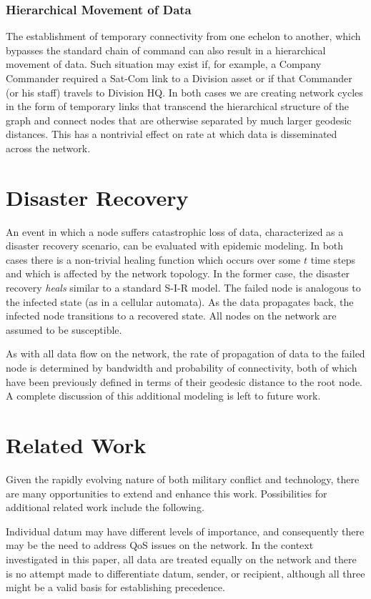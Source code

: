 \documentclass[10pt]{./IEEEtran}
\begin{document}
\subsubsection{Hierarchical Movement of Data}
The establishment of temporary connectivity from one echelon to another, which bypasses the standard chain of command can also result in a hierarchical movement of data.  Such situation may exist if, for example, a Company Commander required a Sat-Com link to a Division asset or if that Commander (or his staff) travels to Division HQ.  In both cases we are creating network cycles in the form of temporary links that transcend the hierarchical structure of the graph and connect nodes that are otherwise separated by much larger geodesic distances.  This has a nontrivial effect\cite{Ganesh:2005} on rate at which data is disseminated across the network.


\section{Disaster Recovery}
\label{sec:dr}
An event in which a node suffers catastrophic loss of data, characterized as a disaster recovery scenario, can be evaluated with epidemic modeling.  In both cases there is a non-trivial healing function which occurs over some $t$ time steps and which is affected by the network topology\cite{Ganesh:2005}.  In the former case, the disaster recovery \emph{heals} similar to a standard S-I-R model.  The failed node is analogous to the infected state (as in a cellular automata).  As the data propagates back, the infected node transitions to a recovered state.  All nodes on the network are assumed to be susceptible.  

As with all data flow on the network, the rate of propagation of data to the failed node is determined by bandwidth and probability of connectivity, both of which have been previously defined in terms of their geodesic distance to the root node.  A complete discussion of this additional modeling is left to future work.


\section{Related Work}
\label{sec:related}
Given the rapidly evolving nature of both military conflict and technology, there are many opportunities to extend and enhance this work.  Possibilities for additional related work include the following.

Individual datum may have different levels of importance, and consequently there may be the need to address QoS issues on the network.  In the context investigated in this paper, all data are treated equally on the network and there is no attempt made to differentiate datum, sender, or recipient, although all three might be a valid basis for establishing precedence.
\end{document}
